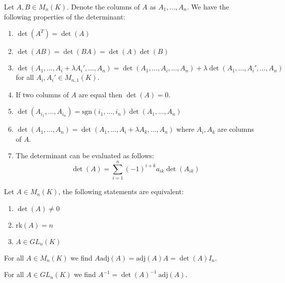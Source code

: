         \begin{property}
			\label{linalgebra:determinant_properties}
            Let $A,B\in M_n(K)$. Denote the columns of $A$ as $A_1, \dotso, A_n$. We have the following properties of the determinant:
            \begin{enumerate}
				\item $\det(A^T) = \det(A)$
                \item $\det(AB) = \det(BA) = \det(A)\det(B)$
                \item $\det(A_1, \dotso, A_i+\lambda A_i', \dotso, A_n) = \det(A_1, \dotso, A_i, \dotso, A_n) + \lambda\det(A_1, \dotso,A_i', \dotso, A_n)$ for all $A_i,A_i'\in M_{n,1}(K)$.
                \item If two columns of $A$ are equal then $\det(A) = 0$.
                \item $\det(A_{i_1},\dotso,A_{i_n}) = \text{sgn}(i_1,\dotso,i_n)\det(A_1,\dotso,A_n)$
                \item $\det(A_1,\dotso,A_n) = \det(A_1,\dotso,A_i+\lambda A_k,\dotso,A_n)$ where $A_i, A_k$ are columns of $A$.
                \item The determinant can be evaluated as follows:
                	\begin{equation}
						\det(A) = \sum_{i=1}^n(-1)^{i+k}a_{ik}\det(A_{ik})
					\end{equation}
			\end{enumerate}
		\end{property}
        
        \begin{theorem}
			\label{linalgebra:theorem:rank_det_equivalence}
            Let $A\in M_n(K)$, the following statements are equivalent:
            \begin{enumerate}
				\item $\det(A) \neq 0$
                \item $\text{rk}(A) = n$
                \item $A\in GL_n(K)$
			\end{enumerate}
		\end{theorem}
        \begin{theorem}
			\label{linalgebra:theorem:adjugate_matrix}
            For all $A\in M_n(K)$ we find $A\text{adj}(A) = \text{adj}(A)A = \det(A)I_n$.
		\end{theorem}
        \begin{theorem}
			\label{linalgebra:theorem:determinant_inverse}
            For all $A\in GL_n(K)$ we find $A^{-1} = \det(A)^{-1}\ \text{adj}(A)$.
		\end{theorem}
        
